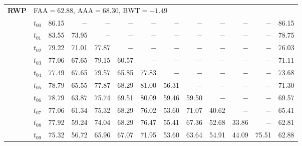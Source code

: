 \begin{table}[ht]
\begin{tabular}{@{}l l r r r r r r r r r r r@{}}
\midrule
\multirow{11}{*}{\textbf{RWP}} & \multicolumn{12}{l}{\quad\small FAA$=62.88$,\; AAA$=68.30$,\; BWT$=-1.49$} \\
 & $t_{00}$ & 86.15 & $-$ & $-$ & $-$ & $-$ & $-$ & $-$ & $-$ & $-$ & $-$ & 86.15 \\
 & $t_{01}$ & 83.55 & 73.95 & $-$ & $-$ & $-$ & $-$ & $-$ & $-$ & $-$ & $-$ & 78.75 \\
 & $t_{02}$ & 79.22 & 71.01 & 77.87 & $-$ & $-$ & $-$ & $-$ & $-$ & $-$ & $-$ & 76.03 \\
 & $t_{03}$ & 77.06 & 67.65 & 79.15 & 60.57 & $-$ & $-$ & $-$ & $-$ & $-$ & $-$ & 71.11 \\
 & $t_{04}$ & 77.49 & 67.65 & 79.57 & 65.85 & 77.83 & $-$ & $-$ & $-$ & $-$ & $-$ & 73.68 \\
 & $t_{05}$ & 78.79 & 65.55 & 77.87 & 68.29 & 81.00 & 56.31 & $-$ & $-$ & $-$ & $-$ & 71.30 \\
 & $t_{06}$ & 78.79 & 63.87 & 75.74 & 69.51 & 80.09 & 59.46 & 59.50 & $-$ & $-$ & $-$ & 69.57 \\
 & $t_{07}$ & 77.06 & 61.34 & 75.32 & 68.29 & 76.02 & 53.60 & 71.07 & 40.62 & $-$ & $-$ & 65.41 \\
 & $t_{08}$ & 77.92 & 59.24 & 74.04 & 68.29 & 76.47 & 55.41 & 67.36 & 52.68 & 33.86 & $-$ & 62.81 \\
 & $t_{09}$ & 75.32 & 56.72 & 65.96 & 67.07 & 71.95 & 53.60 & 63.64 & 54.91 & 44.09 & 75.51 & 62.88 \\
\bottomrule
\end{tabular}
\end{table}

